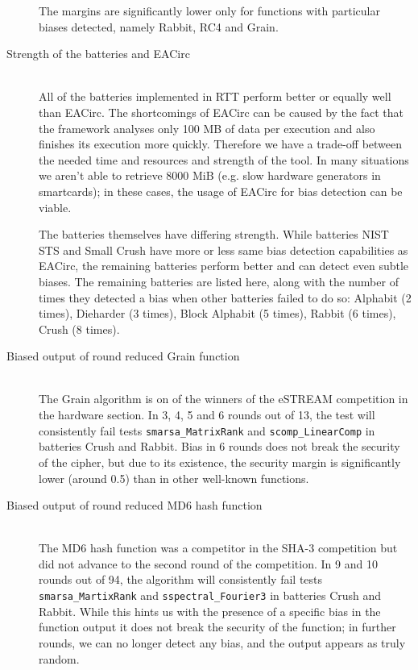 \documentclass[
  digital,  	%
  color,		%
  oneside,   	%
  12pt,
  nocover,
  notable,
  nolof,
  nolot,
]{fithesis3}
\theoremstyle{definition}
\theoremstyle{remark}
\begin{document}
\begin{description}
The margins are significantly lower only for functions with particular biases detected, namely Rabbit, RC4 and Grain.

\item[Strength of the batteries and EACirc] \hfill \\
All of the batteries implemented in RTT perform better or equally well than EACirc. The shortcomings of EACirc can be caused by the fact that the framework analyses only 100 MB of data per execution and also finishes its execution more quickly. Therefore we have a trade-off between the needed time and resources and strength of the tool. In many situations we aren't able to retrieve 8000 MiB (e.g. slow hardware generators in smartcards); in these cases, the usage of EACirc for bias detection can be viable.

The batteries themselves have differing strength. While batteries NIST STS and Small Crush have more or less same bias detection capabilities as EACirc, the remaining batteries perform better and can detect even subtle biases. The remaining batteries are listed here, along with the number of times they detected a bias when other batteries failed to do so: Alphabit (2 times), Dieharder (3 times), Block Alphabit (5 times), Rabbit (6 times), Crush (8 times).

\item[Biased output of round reduced Grain function] \hfill \\
The Grain algorithm is on of the winners of the eSTREAM competition in the hardware section. In 3, 4, 5 and 6 rounds out of 13, the test will consistently fail tests \texttt{smarsa\_MatrixRank} and \texttt{scomp\_LinearComp} in batteries Crush and Rabbit.  Bias in 6 rounds does not break the security of the cipher, but due to its existence, the security margin is significantly lower (around 0.5) than in other well-known functions. 

\item[Biased output of round reduced MD6 hash function] \hfill \\
The MD6 hash function was a competitor in the SHA-3 competition but did not advance to the second round of the competition. In 9 and 10 rounds out of 94, the algorithm will consistently fail tests \texttt{smarsa\_MartixRank} and \texttt{sspectral\_Fourier3} in batteries Crush and Rabbit. While this hints us with the presence of a specific bias in the function output it does not break the security of the function; in further rounds, we can no longer detect any bias, and the output appears as truly random.

\end{description}
\end{document}
